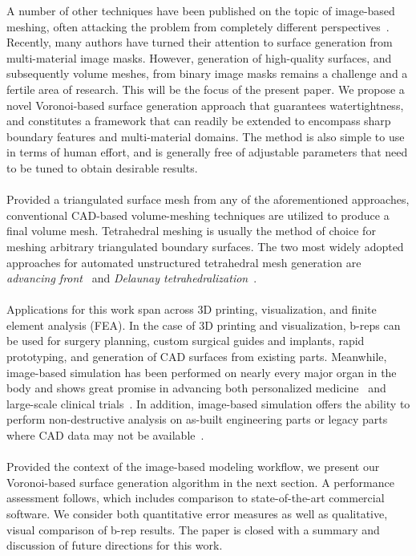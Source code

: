 %
A number of other techniques have been published on the topic of image-based meshing, often attacking the problem from completely different perspectives~\cite{fang_2009, mohamed_2004, jermyn_2013, boissonnat_2009}. Recently, many authors have turned their attention to surface generation from multi-material image masks. However, generation of high-quality surfaces, and subsequently volume meshes, from binary image masks remains a challenge and a fertile area of research. This will be the focus of the present paper.  We propose a novel Voronoi-based surface generation approach that guarantees watertightness, and constitutes a framework that can readily be extended to encompass sharp boundary features and multi-material domains.  The method is also simple to use in terms of human effort, and is generally free of adjustable parameters that need to be tuned to obtain desirable results. \\ \\
%
Provided a triangulated surface mesh from any of the aforementioned approaches, conventional CAD-based volume-meshing techniques are utilized to produce a final volume mesh. Tetrahedral meshing is usually the method of choice for meshing arbitrary triangulated boundary surfaces. The two most widely adopted approaches for automated unstructured tetrahedral mesh generation are \textit{advancing front}~\cite{jin_1993, lohner_1988} and \textit{Delaunay tetrahedralization}~\cite{lohner_1997}. \\ \\
%
Applications for this work span across 3D printing, visualization, and finite element analysis (FEA). In the case of 3D printing and visualization, b-reps can be used for surgery planning, custom surgical guides and implants, rapid prototyping, and generation of CAD surfaces from existing parts. Meanwhile, image-based simulation has been performed on nearly every major organ in the body and shows great promise in advancing both personalized medicine~\cite{neal2010current} and large-scale clinical trials~\cite{viceconti2016silico}. In addition, image-based simulation offers the ability to perform non-destructive analysis on as-built engineering parts or legacy parts where CAD data may not be available~\cite{bradley2005advances}.\\ \\
%
Provided the context of the image-based modeling workflow, we present our Voronoi-based surface generation algorithm in the next section. A performance assessment follows, which includes comparison to state-of-the-art commercial software.  We consider both quantitative error measures as well as qualitative, visual comparison of b-rep results.  The paper is closed with a summary and discussion of future directions for this work.